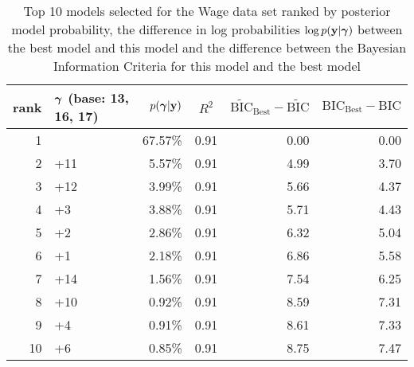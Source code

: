 \documentclass{article}[12pt]
\begin{document}
\begin{table}
	\label{tab:numerical_results_wage}
	\caption{Top 10 models selected for the Wage data set ranked by posterior model probability, the difference
		in log probabilities $\log p({\bf y}|{\boldsymbol \gamma})$ between the best model and this model and the difference
		between the Bayesian Information Criteria for this model and the best model}
	\begin{center}
		\begin{tabular}{r|l|r|c|r|r}
			rank & ${\boldsymbol \gamma}$ (base: 13, 16, 17) & $p({\boldsymbol \gamma}|{\bf y})$ & $R^2$ & $\widetilde{\text{BIC}}_\text{Best} - \widetilde{\text{BIC}}$ & $\text{BIC}_\text{Best} - \text{BIC}$ \\
			\hline
			1 &  &  67.57\%&  0.91&  0.00&  0.00\\
			2 &  +11&  5.57\%&  0.91&  4.99&  3.70\\
			3 &  +12&  3.99\%&  0.91&  5.66&  4.37\\
			4 &  +3&  3.88\%&  0.91&  5.71&  4.43\\
			5 &  +2&  2.86\%&  0.91&  6.32&  5.04\\
			6 &  +1&  2.18\%&  0.91&  6.86&  5.58\\
			7 &  +14&  1.56\%&  0.91&  7.54&  6.25\\
			8 &  +10&  0.92\%&  0.91&  8.59&  7.31\\
			9 &  +4&  0.91\%&  0.91&  8.61&  7.33\\
			10 &  +6&  0.85\%&  0.91&  8.75&  7.47\\
		\end{tabular}
	\end{center}
\end{table}
\end{document}
